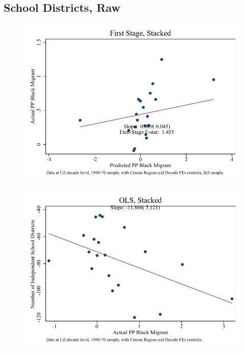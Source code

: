 \documentclass{article}
\begin{document}
\subsection{School Districts, Raw}

\clearpage
\begin{figure}
\centering
\includegraphics{figures/simplefigs/stacked_schdist_ind_raw_C3_full_fs.pdf}
\end{figure}
\clearpage
\begin{figure}
\centering
\includegraphics{figures/simplefigs/stacked_schdist_ind_raw_C3_full_ols.pdf}
\end{figure}
\clearpage
\end{document}

